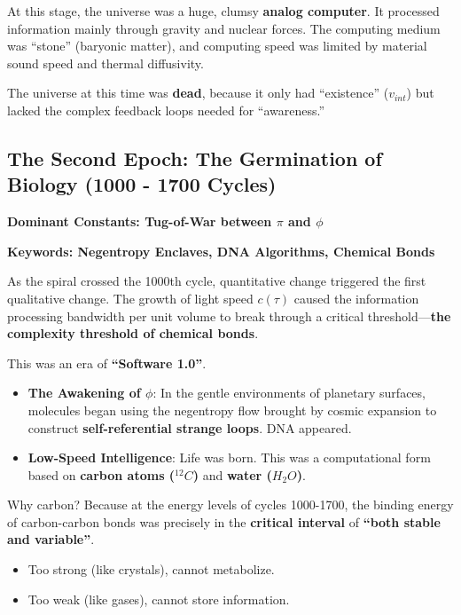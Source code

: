 At this stage, the universe was a huge, clumsy \textbf{analog computer}. It processed information mainly through gravity and nuclear forces. The computing medium was ``stone'' (baryonic matter), and computing speed was limited by material sound speed and thermal diffusivity.

The universe at this time was \textbf{dead}, because it only had ``existence'' ($v_{int}$) but lacked the complex feedback loops needed for ``awareness.''

\subsection{The Second Epoch: The Germination of Biology (1000 - 1700 Cycles)}

\textbf{Dominant Constants: Tug-of-War between $\pi$ and $\phi$}

\textbf{Keywords: Negentropy Enclaves, DNA Algorithms, Chemical Bonds}

As the spiral crossed the 1000th cycle, quantitative change triggered the first qualitative change. The growth of light speed $c(\tau)$ caused the information processing bandwidth per unit volume to break through a critical threshold---\textbf{the complexity threshold of chemical bonds}.

This was an era of \textbf{``Software 1.0''}.

\begin{itemize}
\item \textbf{The Awakening of $\phi$}: In the gentle environments of planetary surfaces, molecules began using the negentropy flow brought by cosmic expansion to construct \textbf{self-referential strange loops}. DNA appeared.

\item \textbf{Low-Speed Intelligence}: Life was born. This was a computational form based on \textbf{carbon atoms ($^{12}C$)} and \textbf{water ($H_2O$)}.
\end{itemize}

Why carbon? Because at the energy levels of cycles 1000-1700, the binding energy of carbon-carbon bonds was precisely in the \textbf{critical interval} of \textbf{``both stable and variable''}.

\begin{itemize}
\item Too strong (like crystals), cannot metabolize.

\item Too weak (like gases), cannot store information.
\end{itemize}


